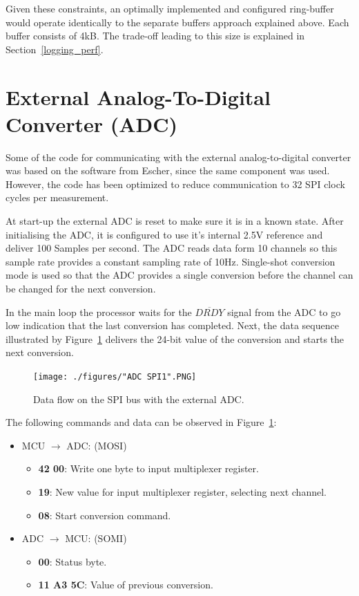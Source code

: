Given these constraints, an optimally implemented and configured ring-buffer would operate identically to the separate buffers approach explained above. Each buffer consists of 4kB. The trade-off leading to this size is explained in Section~\ref{logging_perf}.

\section{External Analog-To-Digital Converter (ADC)}

Some of the code for communicating with the external analog-to-digital converter was based on the software from Escher, since the same component was used. However, the code has been optimized to reduce communication to 32 SPI clock cycles per measurement.

At start-up the external ADC is reset to make sure it is in a known state. After initialising the ADC, it is configured to use it's internal 2.5V reference and deliver 100 Samples per second. The ADC reads data form 10 channels so this sample rate provides a constant sampling rate of 10Hz. Single-shot conversion mode is used so that the ADC provides a single conversion before the channel can be changed for the next conversion.

In the main loop the processor waits for the $\overline{DRDY}$ signal from the ADC to go low indication that the last conversion has completed. Next, the data sequence illustrated by Figure~\ref{fig:adc_spi} delivers the 24-bit value of the conversion and starts the next conversion.

\begin{figure}[H]
    \centering \texttt{[image: ./figures/"ADC SPI1".PNG]}
    \caption{Data flow on the SPI bus with the external ADC.}
    \label{fig:adc_spi}
\end{figure}

The following commands and data can be observed in Figure~\ref{fig:adc_spi}:

\begin{itemize}
    \item MCU $\rightarrow$ ADC: (MOSI)
    \begin{itemize}
        \item \textbf{42 00}: Write one byte to input multiplexer register.
        \item \textbf{19}: New value for input multiplexer register, selecting next channel.
        \item \textbf{08}: Start conversion command.
    \end{itemize}
    \item ADC $\rightarrow$ MCU: (SOMI)
    \begin{itemize}
        \item \textbf{00}: Status byte.
        \item \textbf{11 A3 5C}: Value of previous conversion.
    \end{itemize}
\end{itemize}

